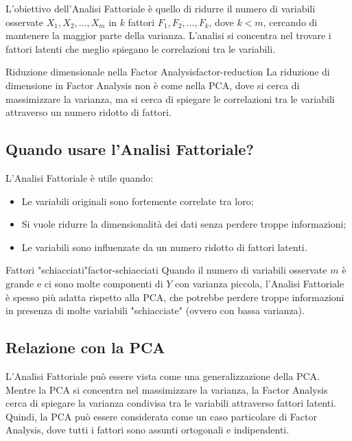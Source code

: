 L'obiettivo dell'Analisi Fattoriale è quello di ridurre il numero di variabili
osservate \( X_1, X_2, \dots, X_m \) in \( k \) fattori \( F_1, F_2, \dots, F_k
\), dove \( k < m \), cercando di mantenere la maggior parte della varianza.
L'analisi si concentra nel trovare i fattori latenti che meglio spiegano le
correlazioni tra le variabili.

\begin{nota}{Riduzione dimensionale nella Factor Analysis}{factor-reduction}
La riduzione di dimensione in Factor Analysis non è come nella PCA, dove si
cerca di massimizzare la varianza, ma si cerca di spiegare le correlazioni tra
le variabili attraverso un numero ridotto di fattori.
\end{nota}

\subsection{Quando usare l'Analisi Fattoriale?}

L'Analisi Fattoriale è utile quando:
\begin{itemize}
  \item Le variabili originali sono fortemente correlate tra loro;
  \item Si vuole ridurre la dimensionalità dei dati senza perdere troppe
  informazioni;
  \item Le variabili sono influenzate da un numero ridotto di fattori latenti.
\end{itemize}

\begin{nota}{Fattori "schiacciati"}{factor-schiacciati}
Quando il numero di variabili osservate \( m \) è grande e ci sono molte
componenti di \( Y \) con varianza piccola, l'Analisi Fattoriale è spesso più
adatta rispetto alla PCA, che potrebbe perdere troppe informazioni in presenza
di molte variabili "schiacciate" (ovvero con bassa varianza).
\end{nota}

\subsection{Relazione con la PCA}

L'Analisi Fattoriale può essere vista come una generalizzazione della PCA.
Mentre la PCA si concentra nel massimizzare la varianza, la Factor Analysis
cerca di spiegare la varianza condivisa tra le variabili attraverso fattori
latenti. Quindi, la PCA può essere considerata come un caso particolare di
Factor Analysis, dove tutti i fattori sono assunti ortogonali e indipendenti.

